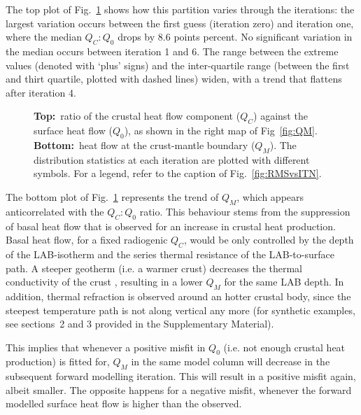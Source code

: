 {The top plot of Fig.~\ref{fig:QMvsITN} shows how this partition varies through the iterations: the largest variation occurs between the first guess (iteration zero) and iteration one, where the median $Q_C:Q_0$ drops by $8.6$ points percent.
No significant variation in the median occurs between iteration 1 and 6.
The range between the extreme values (denoted with `plus' signs) and the inter-quartile range (between the first and thirt quartile, plotted with dashed lines) widen, with a trend that flattens after iteration 4.

\begin{figure}
	\begin{adjustbox}{center}
	\end{adjustbox}
	\caption{\textbf{Top:}~ratio of the crustal heat flow component ($Q_C$) against the surface heat flow ($Q_0$), as shown in the right map of Fig~\ref{fig:QM}. \textbf{Bottom:}~heat flow at the crust-mantle boundary ($Q_M$). The distribution statistics at each iteration are plotted with different symbols. For a legend, refer to the caption of Fig.~\ref{fig:RMSvsITN}.}
	\label{fig:QMvsITN}
\end{figure}

The bottom plot of Fig.~\ref{fig:QMvsITN} represents the trend of $Q_M$, which appears anticorrelated with the ${Q_C:Q_0}$ ratio.
This behaviour stems from the suppression of basal heat flow that is observed for an increase in crustal heat production.
Basal heat flow, for a fixed radiogenic $Q_C$, would be only controlled by the depth of the LAB-isotherm and the series thermal resistance of the LAB-to-surface path.
A steeper geotherm (i.e. a warmer crust) decreases the thermal conductivity of the crust \parencite[see Eq.~\ref{eq:kTzChap86} here and ][]{Chapman1986}, resulting in a lower $Q_M$ for the same LAB depth.
In addition, thermal refraction is observed around an hotter crustal body, since the steepest temperature path is not along vertical any more (for synthetic examples, see sections~2 and 3 provided in the Supplementary Material).

This implies that whenever a positive misfit in $Q_0$ (i.e. not enough crustal heat production) is fitted for, $Q_M$ in the same model column will decrease in the subsequent forward modelling iteration.
This will result in a positive misfit again, albeit smaller.
The opposite happens for a negative misfit, whenever the forward modelled surface heat flow is higher than the observed.

}

